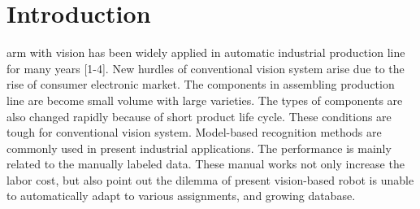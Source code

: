 \documentclass[journal]{IEEEtran}
\begin{document}
\maketitle


\IEEEdisplaynontitleabstractindextext







%
\IEEEpeerreviewmaketitle



\section{Introduction}


% 
% 
% 
% 
 arm with vision has been widely applied in automatic industrial production line for many years [1-4]. New hurdles of conventional vision system arise due to the rise of consumer electronic market. The components in assembling production line are become small volume with large varieties. The types of components are also changed rapidly because of short product life cycle. These conditions are tough for conventional vision system. Model-based recognition methods are commonly used in present industrial applications. The performance is mainly related to the manually labeled data. These manual works not only increase the labor cost, but also point out the dilemma of present vision-based robot is unable to automatically adapt to various assignments, and growing database.
\end{document}
